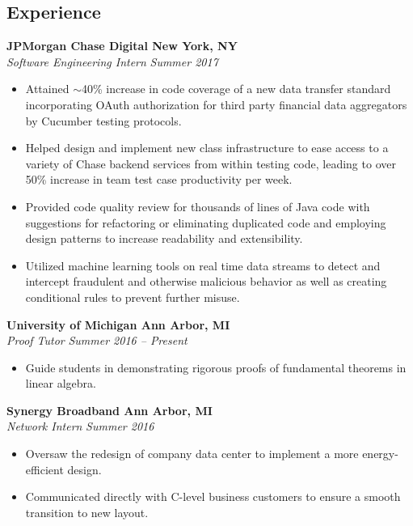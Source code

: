 \documentclass[margin,line]{resume}
\begin{document}
\begin{resume}
	\section{\mysidestyle Experience}
	    
	\textbf{JPMorgan Chase Digital \hfill New York, NY} \\\vspace{1mm}%
	\textsl{Software Engineering Intern} \hfill \textsl{Summer 2017}
	\begin{itemize}[leftmargin=4mm]
		\item Attained $\sim$40\% increase in code coverage of a new data transfer standard incorporating OAuth authorization for third party financial data aggregators by Cucumber testing protocols.
		\item Helped design and implement new class infrastructure to ease access to a variety of Chase backend services from within testing code, leading to over 50\% increase in team test case productivity per week.
		\item Provided code quality review for thousands of lines of Java code with suggestions for refactoring or eliminating duplicated code and employing design patterns to increase readability and extensibility.
		\item Utilized machine learning tools on real time data streams to detect and intercept fraudulent and otherwise malicious behavior as well as creating conditional rules to prevent further misuse. 
	\end{itemize}
	
	\vspace{-1.5mm}
	\textbf{University of Michigan \hfill Ann Arbor, MI} \\\vspace{1mm}%
	\textsl{Proof Tutor} \hfill \textsl{Summer 2016 -- Present}
	\begin{itemize}[leftmargin=4mm]
		\item Guide students in demonstrating rigorous proofs of fundamental theorems in linear algebra.
	\end{itemize}
	
	\vspace{-1.5mm}
	\textbf{Synergy Broadband \hfill Ann Arbor, MI} \\\vspace{1mm}%
	\textsl{Network Intern} \hfill \textsl{Summer 2016}
	\begin{itemize}[leftmargin=4mm]
		\item Oversaw the redesign of company data center to implement a more energy-efficient design.
		\item Communicated directly with C-level business customers to ensure a smooth transition to new layout. 
	\end{itemize}
	\vspace{1.5mm}
	

\end{resume}
\end{document}
